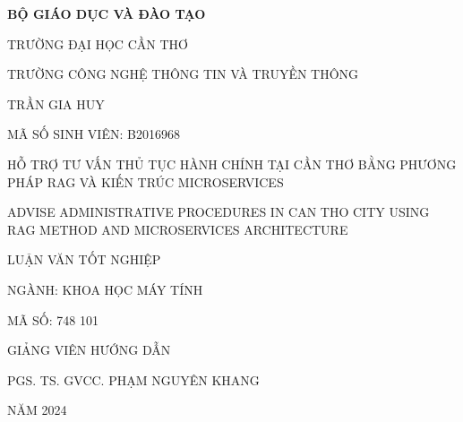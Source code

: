 \begin{center}
    \bf BỘ GIÁO DỤC VÀ ĐÀO TẠO

    TRƯỜNG ĐẠI HỌC CẦN THƠ

    TRƯỜNG CÔNG NGHỆ THÔNG TIN VÀ TRUYỀN THÔNG

    \vspace{2cm}

    TRẦN GIA HUY

    MÃ SỐ SINH VIÊN: B2016968

    \vspace{2cm}

    {\large
        HỖ TRỢ TƯ VẤN THỦ TỤC HÀNH CHÍNH TẠI CẦN THƠ BẰNG PHƯƠNG PHÁP RAG VÀ KIẾN TRÚC MICROSERVICES

        \vspace{1cm}
        ADVISE ADMINISTRATIVE PROCEDURES IN CAN THO CITY USING RAG METHOD AND MICROSERVICES ARCHITECTURE
    }

    \vspace{2cm}

    LUẬN VĂN TỐT NGHIỆP

    NGÀNH: KHOA HỌC MÁY TÍNH

    MÃ SỐ: 748 101

    \vspace{2cm}

    GIẢNG VIÊN HƯỚNG DẪN

    PGS. TS. GVCC. PHẠM NGUYÊN KHANG

    \vspace{4cm}

    NĂM 2024
\end{center}
